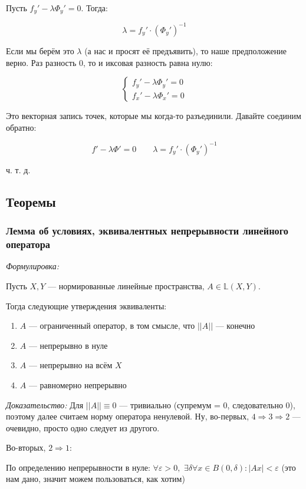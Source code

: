 \documentclass{article}
\def\dbl{\,\,}
\begin{document}
Пусть $f_y' - \lambda\Phi_y' = 0$. Тогда:

\[\lambda = f_y' \cdot \left(\Phi_y'\right)^{-1}\]

Если мы берём это $\lambda$ (а нас и просят её предъявить), то наше предположение верно. Раз разность 0, то и иксовая разность равна нулю:

\[\begin{cases}
    f_y' - \lambda\Phi_y' = 0\\
    f_x' - \lambda\Phi_x' = 0
\end{cases}\]

Это векторная запись точек, которые мы когда-то разъединили. Давайте соединим обратно: 

\[f' - \lambda\Phi' = 0 \qquad \lambda = f_y' \cdot \left(\Phi_y'\right)^{-1}\]

ч. т. д. 

\newpage

\subsection{Теоремы}

\subsubsection{Лемма об условиях, эквивалентных непрерывности линейного оператора}

\textit{Формулировка:}

Пусть $X, Y$ --- нормированные линейные пространства, $A \in \mathbb{L}(X, Y)$.

Тогда следующие утверждения эквиваленты:

\begin{enumerate}
\item $A$ --- ограниченный оператор, в том смысле, что $||A||$ --- конечно
\item $A$ --- непрерывно в нуле
\item $A$ --- непрерывно на всём $X$
\item $A$ --- равномерно непрерывно
\end{enumerate}


\textit{Доказательство:}
Для $||A|| \equiv 0$ --- тривиально (супремум = 0, следовательно 0), поэтому далее считаем норму оператора ненулевой.
Ну, во-первых, $4 \Rightarrow 3 \Rightarrow 2$ --- очевидно, просто одно следует из другого.

Во-вторых,  $2 \Rightarrow 1$:

По определению непрерывности в нуле: $\forall \varepsilon > 0, \dbl \exists \delta  \forall x \in B(0, \delta): |Ax| < \varepsilon$ (это нам дано, значит можем пользоваться, как хотим)
\end{document}
